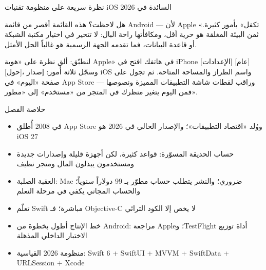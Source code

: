 \begin{center}\small\color{gray}نظرة سريعة على منظومة تقنيات iOS السائدة في 2026\end{center}

هل لاحظت؟ هذه القائمة أقصر من قائمة Android — لأن Apple «تكفل» بأمور كثيرة. ثمن البيئة المغلقة هو حرية أقل، ومكافأتها راحة البال: لا تتحير في اختيار مكتبة الشبكة أو قاعدة البيانات، فما تقدمه الجهة الرسمية هو غالباً الحل الأمثل.

\begin{tcbpractice}{لنطبّق: ألقِ نظرة على «هوية Apple» في هاتفك}
افتح في iPhone [الإعدادات] [عام] [حول]، وسجّل ثلاثة أمور: إصدار iOS واسم الطراز والمساحة المتاحة. ثم تجول على صفحة «اليوم» في App Store وراقب لقطات شاشة التطبيقات المميزة ونصوصها — فمن اليوم يتغير منظرك في المتجر من «مستخدم» إلى «مطور».

\end{tcbpractice}

\begin{tcbsummary}{خلاصة الفصل}
\begin{itemize}
  \item في 2008 أُطلق App Store ووُلد «اقتصاد التطبيقات»؛ والإصدار الحالي في 2026 هو iOS 27
  \item حساب الحديقة المسوّرة: قواعد كثيرة، لكن أجهزة قليلة وإصدارات جديدة ومستخدمون يبذلون المال ومتجر نظيف
  \item العقبة الصلبة: Mac ضروري؛ والنشر يتطلب حساب مطوّر بـ 99 دولاراً سنوياً؛ والحساب المجاني يكفي في مرحلة التعلم
  \item تعلّم Swift مباشرة؛ فـ Objective-C لا يخص إلا الكود التراثي
  \item خط الإنتاج أطول بخطوة من Android: مراجعة Apple؛ وTestFlight أداة توزيع الاختبار الداخلي المذهلة
  \item منظومة 2026 القياسية: Swift 6 + SwiftUI + MVVM + SwiftData + URLSession + Xcode
\end{itemize}

\end{tcbsummary}
